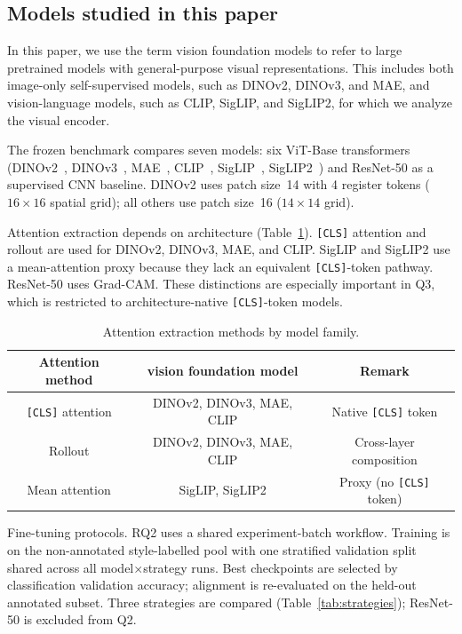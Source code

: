 \documentclass[lineno,pdflatex,sn-mathphys-num]{sn-jnl}%
\theoremstyle{thmstyleone}%
\theoremstyle{thmstyletwo}%
\theoremstyle{thmstylethree}%
\begin{document}
\subsection{Models studied in this paper}

In this paper, we use the term vision foundation models to refer to large pretrained models with general-purpose visual representations. This includes both image-only self-supervised models, such as DINOv2, DINOv3, and MAE, and vision-language models, such as CLIP, SigLIP, and SigLIP2, for which we analyze the visual encoder.

The frozen benchmark compares seven models: six ViT-Base transformers (DINOv2~\cite{Oquab24DINOv2}, DINOv3~\cite{Simeoni26DINOv3}, MAE~\cite{He22MAE}, CLIP~\cite{Radford21CLIP}, SigLIP~\cite{Zhai23SigLIP}, SigLIP2~\cite{Tschannen25SigLIP2}) and ResNet-50 as a supervised CNN baseline. DINOv2 uses patch size~14 with 4 register tokens ($16\!\times\!16$ spatial grid); all others use patch size~16 ($14\!\times\!14$ grid).

Attention extraction depends on architecture (Table~\ref{table attention method list}). \texttt{[CLS]} attention and rollout are used for DINOv2, DINOv3, MAE, and CLIP. SigLIP and SigLIP2 use a mean-attention proxy because they lack an equivalent \texttt{[CLS]}-token pathway. ResNet-50 uses Grad-CAM. These distinctions are especially important in Q3, which is restricted to architecture-native \texttt{[CLS]}-token models.

\begin{table}[!h]
\centering \caption{Attention extraction methods by model family. \label{table attention method list}}
\begin{tabular}{ccc}
\toprule
Attention method & vision foundation model & Remark \\ \midrule
\texttt{[CLS]} attention & DINOv2, DINOv3, MAE, CLIP & Native \texttt{[CLS]} token \\
Rollout & DINOv2, DINOv3, MAE, CLIP & Cross-layer composition \\
Mean attention & SigLIP, SigLIP2 & Proxy (no \texttt{[CLS]} token) \\
\bottomrule
\end{tabular}
\end{table}

Fine-tuning protocols. RQ2 uses a shared experiment-batch workflow. Training is on the non-annotated style-labelled pool with one stratified validation split shared across all model$\times$strategy runs. Best checkpoints are selected by classification validation accuracy; alignment is re-evaluated on the held-out annotated subset. Three strategies are compared (Table~\ref{tab:strategies}); ResNet-50 is excluded from Q2.
\end{document}
